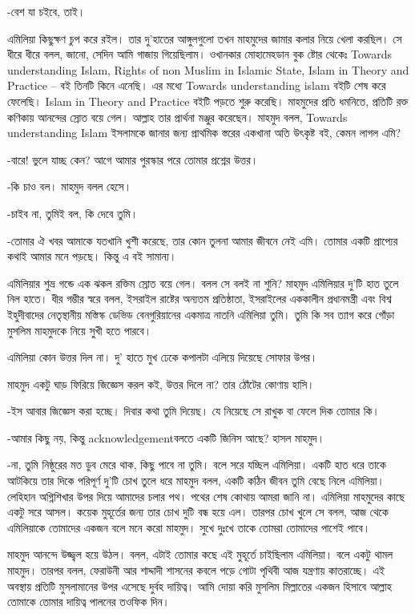 \documentclass[
]{book}
\begin{document}
-বেশ যা চইবে, তাই।

এমিলিয়া কিছুক্ষণ চুপ করে রইল। তার দু'হাতের আঙ্গুলগুলো তখন মাহমুদের জামার কলার নিয়ে খেলা করছিল। সে ধীরে ধীরে বলল, জানো, সেদিন আমি গাজায় গিয়েছিলাম। ওখানকার মোহামেহডান বুক ষ্টোর থেকেঃ Towards understanding Islam, Rights of non Muslim in Islamic State, Islam in Theory and Practice -- বই তিনটি কিনে এনেছি। এর মধ্যে Towards understanding islam বইটি শেষ করে ফেলেছি। Islam in Theory and Practice বইটি পড়তে শুরু করেছি। মাহমুদের প্রতি ধমনিতে, প্রতিটি রক্ত কণিকায় আনন্দের স্রোত বয়ে গেল। আল্লাহ তার প্রার্থনা মঞ্জুর করেছেন। মাহমুদ বলল, Towards understanding Islam ইসলামকে জানার জন্য প্রাথমিক স্তরের একখানা অতি উৎকৃষ্ট বই, কেমন লাগল এমি?

-বারে! ভুলে যাচ্ছ কেন? আগে আমার পুরস্কার পরে তোমার প্রশ্নের উত্তর।

-কি চাও বল। মাহমুদ বলল হেসে।

-চাইব না, তুমিই বল, কি দেবে তুমি।

-তোমার ঐ খবর আমাকে যতখানি খুশী করেছে, তার কোন তুলনা আমার জীবনে নেই এমি। তোমার একটি প্রাপ্যের কথাই আমার মনে পড়ছে। কিন্তু এ বই সামান্য।

এমিলিয়ার শুভ্র গন্ডে এক ঝকল রক্তিম স্রোত বয়ে গেল। বলল সে বলই না শুনি? মাহমুদ এমিলিয়ার দু'টি হাত তুলে নিল হাতে। ধীর গম্ভীর স্বরে বলল, ইসরাইল রাষ্টের অন্যতম প্রতিষ্ঠাতা, ইসরাইলের এককালীন প্রধানমন্ত্রী এবং বিশ্ব ইহুদীবাদের নেতৃস্থানীয় মস্তিস্ক ডেভিড বেনগুরিয়ানের একমাত্র নাতনি এমিলিয়া তুমি। তুমি কি সব ত্যাগ করে গোঁড়া মুসলিম মাহমুদকে নিয়ে সুখী হতে পারবে।

এমিলিয়া কোন উত্তর দিল না। দু' হাতে মুখ ঢেকে কপালটা এলিয়ে দিয়েছে সোফার উপর।

মাহমুদ একটু ঘাড় ফিরিয়ে জিজ্ঞেস করল কই, উত্তর দিলে না? তার ঠোঁটের কোণায় হাসি।

-ইস আবার জিজ্ঞেস করা হচ্ছে। দিবার কথা তুমি দিয়েছ। যে নিয়েছে সে রাখুক বা ফেলে দিক তোমার কি।

-আমার কিছু নয়, কিন্তু acknowledgementবলতে একটি জিনিস আছে? হাসল মাহমুদ।

-না, তুমি নিষ্ঠুরের মত ডুব মেরে থাক, কিছু পাবে না তুমি। বলে সরে যচ্ছিল এমিলিয়া। একটি হাত ধরে তাকে আটকিয়ে তার দিকে পরিপূর্ণ দু'টি চোখ তুলে ধরে মাহমুদ বলল, একটি কঠিন জীবন তুমি বেছে নিলে এমিলিয়া। লেহিহান অগ্নিশিখার উপর দিয়ে আমাদের চলার পথ। পথের শেষ কোথায় আমরা জানি না। এমিলিয়া মাহমুদের কাছে একটু সরে আসল। কয়েক মুহূর্তের জন্য তার চোখ দুটি বন্ধ হয়ে এল। তারপর চোখ খুলে সে বলল, আজ থেকে এমিলিয়াকে তোমাদের একজন বলে মনে করো মাহমুদ। সুখে দুঃখে তাকে তোমরা তোমাদের পাশেই পাবে।

মাহমুদ আনন্দে উজ্জ্বল হয়ে উঠল। বলল, এটাই তোমার কছে এই মুহূর্তে চাইছিলাম এমিলিয়া। বলে একটু থামল মাহমুদ। তারপর বলল, ফেরাউনী আর শাদ্দাদী শাসনের কবলে পড়ে গোটা পৃথিবী আজ যন্ত্রণায় কাতরাচ্ছে। এই অবস্থায় প্রতিটি মুসলামানের উপর এসেছে দুর্বহ দায়িত্ব। আমি দোয়া করি মুসলিম মিল্লাতের একজন হিসাবে আল্লাহ তোমাকে তোমার দায়িত্ব পালনের তওফিক দিন।
\end{document}
